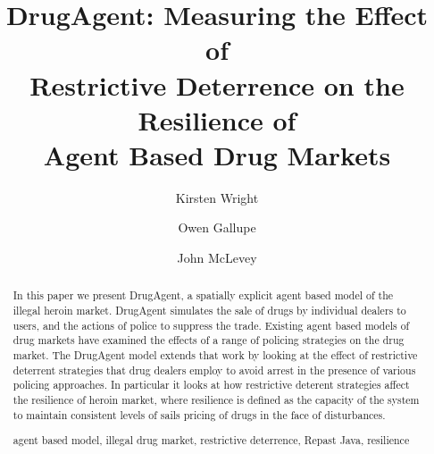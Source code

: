 \documentclass[runningheads,a4paper]{llncs}
\newcommand{\keywords}[1]{\par\addvspace\baselineskip
\noindent\keywordname\enspace\ignorespaces#1}
\begin{document}
\mainmatter  %

\title{DrugAgent: Measuring the Effect of \\Restrictive Deterrence on the Resilience of \\Agent Based Drug Markets}
%
%
\author{Kirsten Wright %
\and Owen Gallupe \and John McLevey}
%




\maketitle


\begin{abstract}

In this paper we present DrugAgent, a spatially explicit agent based model of the illegal heroin market. DrugAgent simulates the sale of drugs by individual dealers to users, and the actions of police to suppress the trade. Existing agent based models of drug markets have examined the effects of a range of policing strategies on the drug market. The DrugAgent model extends that work by looking at the effect of restrictive deterrent strategies that drug dealers employ to avoid arrest in the presence of various policing approaches. In particular it looks at how restrictive deterent strategies affect the resilience of heroin market, where resilience is defined as the capacity of the system to maintain consistent levels of sails pricing of drugs in the face of disturbances.


\keywords{agent based model, illegal drug market, restrictive deterrence, Repast Java, resilience}
\end{abstract}
\end{document}
